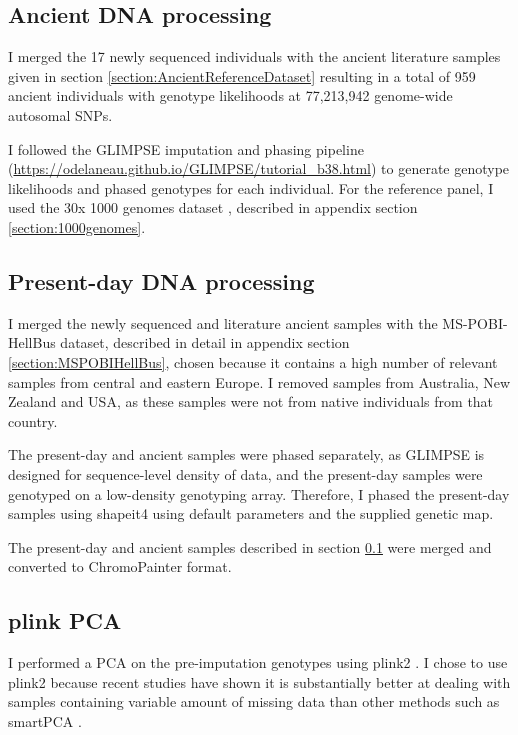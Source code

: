\subsection{Ancient DNA processing} \label{AncientDNAprocessing}

I merged the 17 newly sequenced individuals with the ancient literature samples given in section \ref{section:AncientReferenceDataset} resulting in a total of 959 ancient individuals with genotype likelihoods at 77,213,942 genome-wide autosomal SNPs. 

I followed the GLIMPSE \cite{rubinacci2021efficient} imputation and phasing pipeline (\url{https://odelaneau.github.io/GLIMPSE/tutorial_b38.html}) to generate genotype likelihoods and phased genotypes for each individual. For the reference panel, I used the 30x 1000 genomes dataset \cite{byrska2021high}, described in appendix section \ref{section:1000genomes}.  

\subsection{Present-day DNA processing} \label{PresentdayDNAprocessing}

I  merged the newly sequenced and literature ancient samples with the MS-POBI-HellBus dataset, described in detail in appendix section \ref{section:MSPOBIHellBus}, chosen because it contains a high number of relevant samples from central and eastern Europe. I removed samples from Australia, New Zealand and USA, as these samples were not from native individuals from that country.  

The present-day and ancient samples were phased separately, as GLIMPSE is designed for sequence-level density of data, and the present-day samples were genotyped on a low-density genotyping array. Therefore, I phased the present-day samples using shapeit4 \cite{delaneau2018integrative} using default parameters and the supplied genetic map.

The present-day and ancient samples described in section \ref{AncientDNAprocessing} were merged and converted to ChromoPainter format.

\subsection{plink PCA}

I performed a PCA on the pre-imputation genotypes using plink2 \cite{chang2015second}. I chose to use plink2 because recent studies have shown it is substantially better at dealing with samples containing variable amount of missing data than other methods such as smartPCA \cite{AlbrechtsenPCAmissingness}.

